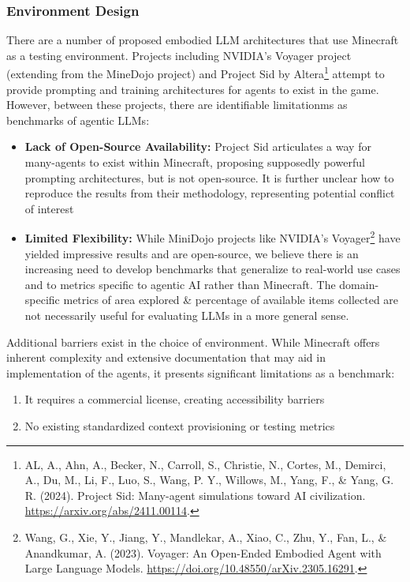\documentclass{article}
\begin{document}
\subsubsection{Environment Design}
There are a number of proposed embodied LLM architectures that use Minecraft as a testing environment.
Projects including NVIDIA's Voyager project (extending from the MineDojo project) and Project Sid by Altera\footnote{AL, A., Ahn, A., Becker, N., Carroll, S., Christie, N., Cortes, M., Demirci, A., Du, M., Li, F., Luo, S., Wang, P. Y., Willows, M., Yang, F., \& Yang, G. R. (2024). Project Sid: Many-agent simulations toward AI civilization. \url{https://arxiv.org/abs/2411.00114}.} attempt to provide prompting and training architectures for agents to exist in the game.
However, between these projects, there are identifiable limitationms as benchmarks of agentic LLMs:
\begin{itemize}
    \item \textbf{Lack of Open-Source Availability:}
          Project Sid articulates a way for many-agents to exist within Minecraft, proposing supposedly powerful prompting architectures, but is not open-source.
          It is further unclear how to reproduce the results from their methodology, representing potential conflict of interest
    \item \textbf{Limited Flexibility:}
          While MiniDojo projects like NVIDIA's Voyager\footnote{Wang, G., Xie, Y., Jiang, Y., Mandlekar, A., Xiao, C., Zhu, Y., Fan, L., \& Anandkumar, A. (2023). Voyager: An Open-Ended Embodied Agent with Large Language Models. \url{https://doi.org/10.48550/arXiv.2305.16291}.} have yielded impressive results and are open-source, we believe there is an increasing need to develop benchmarks that generalize to real-world use cases and to metrics specific to agentic AI rather than Minecraft.
          The domain-specific metrics of area explored \& percentage of available items collected are not necessarily useful for evaluating LLMs in a more general sense.
\end{itemize}

Additional barriers exist in the choice of environment.
While Minecraft offers inherent complexity and extensive documentation that may aid in implementation of the agents, it presents significant limitations as a benchmark:
\begin{enumerate}
    \item It requires a commercial license, creating accessibility barriers
    \item No existing standardized context provisioning or testing metrics
\end{enumerate}
\end{document}
